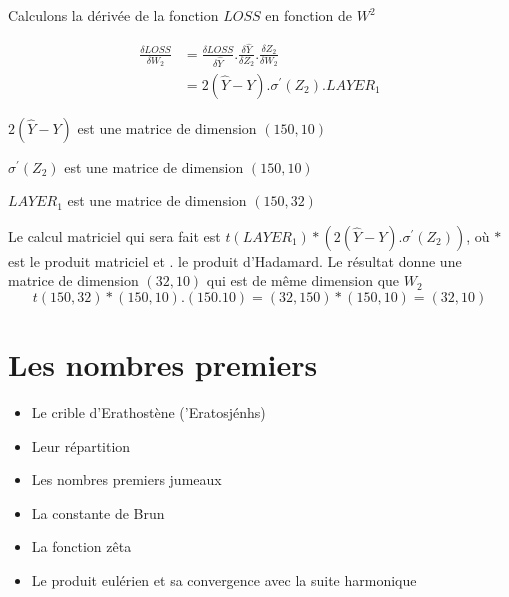 \documentclass[11pt]{book}
\begin{document}
Calculons la dérivée de la fonction $LOSS$ en fonction de $W^2$ 

\begin{align}
\frac{\delta LOSS}{\delta W_2} & =\frac{\delta LOSS}{\delta \hat{Y}} . \frac{\delta \hat{Y}}{\delta Z_2}. \frac{\delta Z_2}{\delta W_2 } \\
 &= 2(\hat{Y}-Y) . \sigma ^\prime (Z_2) . LAYER_1 
\end{align}

$2(\hat{Y}-Y)$ est une matrice de dimension $(150, 10)$

$\sigma ^\prime (Z_2)$ est une matrice de dimension $(150,10)$

$LAYER_1$ est une matrice de dimension $(150,32)$

Le calcul matriciel qui sera fait est $t(LAYER_1)* (2(\hat{Y}-Y) . \sigma ^\prime (Z_2))$, où $*$ est le produit matriciel et $.$ le produit d'Hadamard.
Le résultat donne une matrice de dimension $(32,10)$ qui est de même dimension que $W_2$
$$
t(150,32) * (150,10).(150.10) = (32,150)*(150,10)=(32,10)
$$


\section{Les nombres premiers}

\begin{itemize}
	\item Le crible d'Erathostène (\textgreek{'Eratosjénhs}) 
	\item Leur répartition
	\item Les nombres premiers jumeaux
	\item La constante de Brun 
	\item La fonction zêta
	\item Le produit eulérien et sa convergence avec la suite harmonique
\end{itemize}
\end{document}
